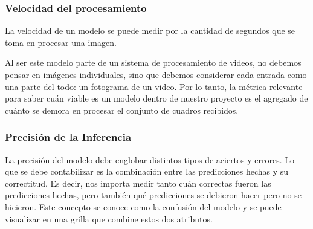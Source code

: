 \documentclass[a4paper]{article}
\begin{document}
\subsubsection{Velocidad del procesamiento}

La velocidad de un modelo se puede medir por la cantidad de segundos que se toma en procesar una imagen.

Al ser este modelo parte de un sistema de procesamiento de videos, no debemos pensar en imágenes individuales, sino que debemos considerar cada entrada como una parte del todo: un fotograma de un video. Por lo tanto, la métrica relevante para saber cuán viable es un modelo dentro de nuestro proyecto es el agregado de cuánto se demora en procesar el conjunto de cuadros recibidos.

\subsubsection{Precisión de la Inferencia}

La precisión del modelo debe englobar distintos tipos de aciertos y errores. Lo que se debe contabilizar es la combinación entre las predicciones hechas y su correctitud. Es decir, nos importa medir tanto cuán correctas fueron las predicciones hechas, pero también qué predicciones se debieron hacer pero no se hicieron. Este concepto se conoce como la confusión del modelo y se puede visualizar en una grilla que combine estos dos atributos.

\begin{figure}[H]
\end{figure}
\end{document}

